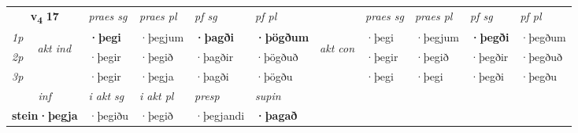 \noindent
\begin{tabular}{lllllllllll} \toprule
\multicolumn{2}{c}{\textbf{v{\textsubscript{4}}} \Large{\textbf{17}}}  &  \textit{praes sg}  & \textit{praes pl}  &\textit{ pf sg} & \textit{pf pl} &  &  \textit{praes sg}  & \textit{praes pl}  & \textit{pf sg} & \textit{pf pl } \\*
	\cmidrule{3-6} \cmidrule{8-11}
 {\textit{1p}} & \multirow{3}{*}{\begin{turn}{90}\textit{akt ind}\end{turn}} & \textbf{·þegi} & ·þegjum & \textbf{·þagði} & \textbf{·þögðum} & \multirow{3}{*}{\begin{turn}{90}\textit{akt con}\end{turn}} &·þegi & ·þegjum & \textbf{·þegði} & ·þegðum\\*
 {\textit{2p}} &  &  ·þegir  & ·þegið & ·þagðir & ·þögðuð & & ·þegir & ·þegið & ·þegðir & ·þegðuð \\*
{\textit{3p}} &  & ·þegir & ·þegja & ·þagði & ·þögðu & & ·þegi & ·þegi& ·þegði & ·þegðu \\*
\cmidrule{3-6} \cmidrule{8-11}

   \multicolumn{2}{c}{\textit{inf}}  & \textit{i akt sg} & \textit{i akt pl}   & \textit{presp} & \textit{supin}   \\*
  \multicolumn{2}{c}{\textbf{stein\allowbreak ·þegja}} & ·þegiðu  & ·þegið   & ·þegjandi &  \textbf{·þagað}   \\*
\end{tabular}

